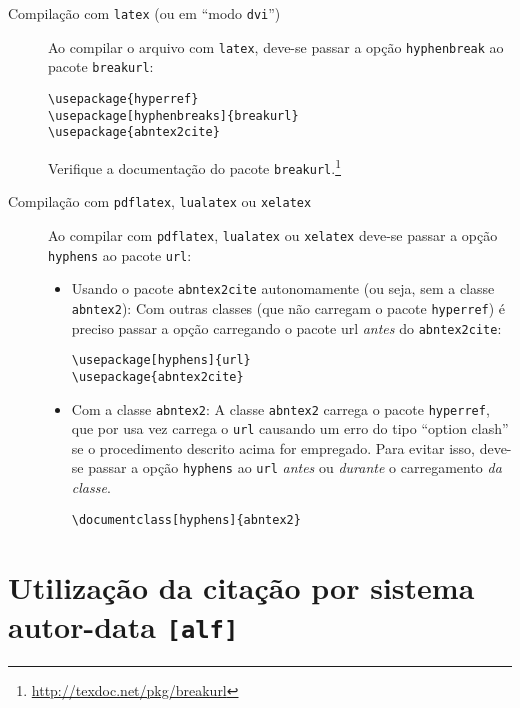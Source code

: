 \documentclass[a4paper]{ltxdoc}
\begin{document}
\begin{description}

  \item[Compilação com \texttt{latex} (ou em ``modo \texttt{dvi}'')]
    Ao compilar o arquivo com \texttt{latex}, deve-se passar a opção
    \texttt{hyphenbreak} ao pacote \texttt{breakurl}:

    \begin{verbatim}
\usepackage{hyperref}
\usepackage[hyphenbreaks]{breakurl}
\usepackage{abntex2cite}
    \end{verbatim}

    Verifique a documentação do pacote
    \texttt{breakurl}.\footnote{\url{http://texdoc.net/pkg/breakurl}}

  \item[Compilação com \texttt{pdflatex}, \texttt{lualatex} ou
    \texttt{xelatex}] Ao compilar com \texttt{pdflatex},
    \texttt{lualatex} ou \texttt{xelatex} deve-se passar a opção
    \texttt{hyphens} ao pacote \texttt{url}:

    \begin{itemize}
      \item Usando o pacote \texttt{abntex2cite} autonomamente (ou
        seja, sem a classe \texttt{abntex2}): Com outras classes (que
        não carregam o pacote \texttt{hyperref}) é preciso passar a
        opção carregando o pacote url \emph{antes} do
        \texttt{abntex2cite}:

        \begin{verbatim}
\usepackage[hyphens]{url}
\usepackage{abntex2cite}
        \end{verbatim}

    \item Com a classe \texttt{abntex2}: A classe \texttt{abntex2}
      carrega o pacote \texttt{hyperref}, que por usa vez carrega o
      \texttt{url} causando um erro do tipo ``option clash'' se o
      procedimento descrito acima for empregado. Para evitar isso,
      deve-se passar a opção \texttt{hyphens} ao \texttt{url}
      \emph{antes} ou \emph{durante} o carregamento \emph{da classe}.

        \begin{verbatim}
\documentclass[hyphens]{abntex2}
        \end{verbatim}

    \end{itemize}
\end{description}

\section{Utilização da citação por sistema autor-data \texttt{[alf]}}
\end{document}
